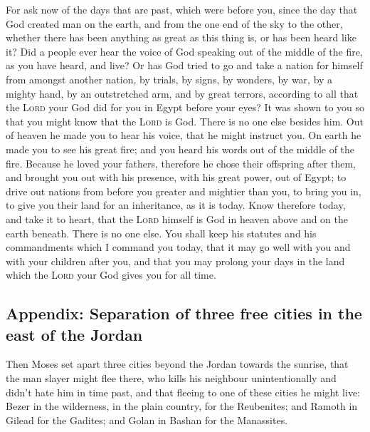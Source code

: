  For ask now of the days that are past, which were before
you, since the day that God created man on the earth, and from the one
end of the sky to the other, whether there has been anything as great as
this thing is, or has been heard like it?  Did a people
ever hear the voice of God speaking out of the middle of the fire, as
you have heard, and live?  Or has God tried to go and
take a nation for himself from amongst another nation, by trials, by
signs, by wonders, by war, by a mighty hand, by an outstretched arm, and
by great terrors, according to all that the \textsc{Lord} your God did
for you in Egypt before your eyes?  It was shown to you
so that you might know that the \textsc{Lord} is God. There is no one
else besides him.  Out of heaven he made you to hear his
voice, that he might instruct you. On earth he made you to see his great
fire; and you heard his words out of the middle of the fire.
 Because he loved your fathers, therefore he chose their
offspring after them, and brought you out with his presence, with his
great power, out of Egypt;  to drive out nations from
before you greater and mightier than you, to bring you in, to give you
their land for an inheritance, as it is today.  Know
therefore today, and take it to heart, that the \textsc{Lord} himself is
God in heaven above and on the earth beneath. There is no one else.
 You shall keep his statutes and his commandments which I
command you today, that it may go well with you and with your children
after you, and that you may prolong your days in the land which the
\textsc{Lord} your God gives you for all time.

\hypertarget{appendix-separation-of-three-free-cities-in-the-east-of-the-jordan}{%
\subsection{Appendix: Separation of three free cities in the east of the
Jordan}\label{appendix-separation-of-three-free-cities-in-the-east-of-the-jordan}}

 Then Moses set apart three cities beyond the Jordan
towards the sunrise,  that the man slayer might flee
there, who kills his neighbour unintentionally and didn't hate him in
time past, and that fleeing to one of these cities he might live:
 Bezer in the wilderness, in the plain country, for the
Reubenites; and Ramoth in Gilead for the Gadites; and Golan in Bashan
for the Manassites.

